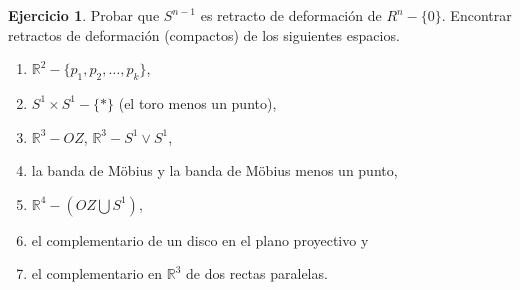 \documentclass{article}
\theoremstyle{plain}
\theoremstyle{definition}
\newtheorem{exercise}{Ejercicio}
\newcommand{\R}{\mathbb{R}}
\begin{document}
\begin{exercise}
Probar que $S^{n-1}$ es retracto de deformación de $R^n-\{0\}$. Encontrar retractos de deformación (compactos) de los siguientes espacios.
\begin{enumerate}
\item $\R^2-\{p_1,p_2,\dotsc,p_k\}$,
\item $S^1\times S^1-\{*\}$ (el toro menos un punto),
\item $\R^3-OZ$, $\R^3-S^1\lor S^1$,
\item la banda de Möbius y la banda de Möbius menos un punto,
\item $\R^4-(OZ\bigcup S^1)$,
\item el complementario de un disco en el plano proyectivo y
\item el complementario en $\R^3$ de dos rectas paralelas.
\end{enumerate}
\end{exercise}
\end{document}
